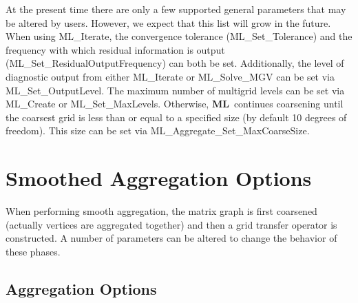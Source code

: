 \documentclass{article}[11pt]
\newcommand{\ML}     {{\bf ML}}
\begin{document}
At the present time there are only a few supported general parameters
that may be altered by users. However, we expect that this list will
grow in the future.  When using {\sf ML\_Iterate}, the convergence
tolerance ({\sf ML\_Set\_Tolerance}) and the frequency with which
residual information is output ({\sf ML\_Set\_ResidualOutputFrequency})
can both be set. Additionally, the level of diagnostic output from
either {\sf ML\_Iterate} or {\sf ML\_Solve\_MGV } can be set via {\sf
  ML\_Set\_OutputLevel}.  The maximum number of multigrid levels can be
set via {\sf ML\_Create} or {\sf ML\_Set\_MaxLevels}. Otherwise, \ML\
continues coarsening until the coarsest grid is less than or equal to a
specified size (by default 10 degrees of freedom).  This size can be set
via {\sf ML\_Aggregate\_Set\_MaxCoarseSize}.

\section{Smoothed Aggregation Options} \label{aggregation options}
When performing smooth aggregation, the matrix graph is first coarsened 
(actually vertices are aggregated together) and then a grid transfer
operator is constructed.  A number of parameters can be altered to
change the behavior of these phases. 

\subsection{Aggregation Options}
\end{document}
